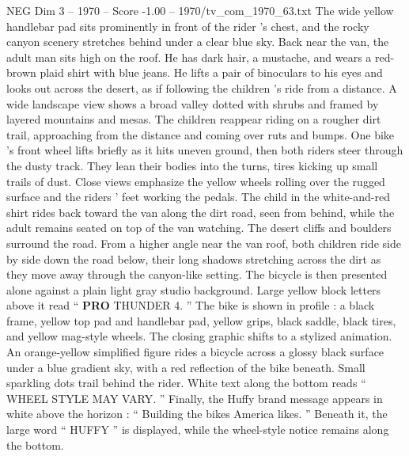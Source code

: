 \begin{textsample}{NEG Dim 3 – 1970 – Score -1.00 – 1970/tv\_com\_1970\_63.txt}
The wide yellow handlebar pad sits prominently in front of the rider ’s chest, and the rocky canyon scenery stretches behind under a clear blue sky.
Back near the van, the adult man sits high on the roof.
He has dark hair, a mustache, and wears a red-brown plaid shirt with blue jeans.
He lifts a pair of binoculars to his eyes and looks out across the desert, as if following the children ’s ride from a distance.
A wide landscape view shows a broad valley dotted with shrubs and framed by layered mountains and mesas.
The children reappear riding on a rougher dirt trail, approaching from the distance and coming over ruts and bumps.
One bike ’s front wheel lifts briefly as it hits uneven ground, then both riders steer through the dusty track.
They lean their bodies into the turns, tires kicking up small trails of dust.
Close views emphasize the yellow wheels rolling over the rugged surface and the riders ’ feet working the pedals.
The child in the white-and-red shirt rides back toward the van along the dirt road, seen from behind, while the adult remains seated on top of the van watching.
The desert cliffs and boulders surround the road.
From a higher angle near the van roof, both children ride side by side down the road below, their long shadows stretching across the dirt as they move away through the canyon-like setting.
The bicycle is then presented alone against a plain light gray studio background.
Large yellow block letters above it read “ \textbf{PRO} THUNDER 4. ” The bike is shown in profile : a black frame, yellow top pad and handlebar pad, yellow grips, black saddle, black tires, and yellow mag-style wheels.
The closing graphic shifts to a stylized animation.
An orange-yellow simplified figure rides a bicycle across a glossy black surface under a blue gradient sky, with a red reflection of the bike beneath.
Small sparkling dots trail behind the rider.
White text along the bottom reads “ WHEEL STYLE MAY VARY. ” Finally, the Huffy brand message appears in white above the horizon : “ Building the bikes America likes. ” Beneath it, the large word “ HUFFY ” is displayed, while the wheel-style notice remains along the bottom.

\end{textsample}
